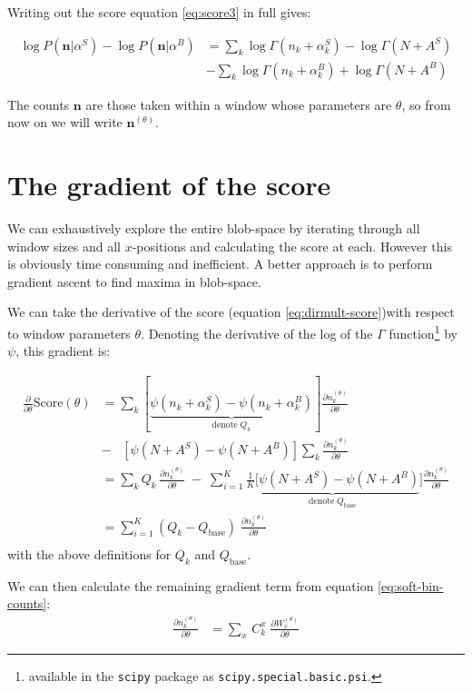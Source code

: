 \documentclass{report}
\begin{document}
Writing out the score equation \ref{eq:score3} in full gives:

\begin{align*}
\log {P(\textbf{n} | \alpha^S)} - \log {P(\textbf{n} | \alpha^B)} &= \sum_k \log \Gamma (n_k + \alpha^S_k) - \log \Gamma (N + A^S) \\
&- \sum_k \log \Gamma (n_k + \alpha^B_k) + \log \Gamma (N + A^B) \label{eq:dirmult-score}
\end{align*}

The counts $\textbf{n}$ are those taken within a window whose parameters are $\theta$, so from now on we will write  $\textbf{n}^{(\theta)}$.


\section{The gradient of the score}

We can exhaustively explore the entire blob-space by iterating through all window sizes and all $x$-positions and calculating the score at each. However this is obviously time consuming and inefficient. A better approach is to perform gradient ascent to find maxima in blob-space.

We can take the derivative of the score (equation
\ref{eq:dirmult-score})with respect to window parameters $\theta$.
Denoting the derivative of the log of the $\Gamma$
function\footnote{available in the {\tt scipy} package as
  \texttt{scipy.special.basic.psi}.} by $\psi$, this gradient is:

\begin{align}
\frac{\partial}{\partial\theta}\text{Score}(\theta) 
&= \sum_k [\underbrace{\psi(n_k + \alpha^S_k) - \psi(n_k + \alpha^B_k)}_{\text{denote} \; Q_k}] \frac{\partial n_k^{(\theta)}}{\partial\theta}\\
& - \;\;\; [\psi(N+A^S) - \psi(N+A^B)]\sum_k \frac{\partial n_k^{(\theta)}}{\partial\theta}\\
&= \sum_k  Q_k \, \frac{\partial n_k^{(\theta)}}{\partial\theta}\;-\;
\sum_{i =1}^K
\underbrace{ \frac{1}{K}[\psi(N+A^S) - \psi(N+A^B)}_{\text{denote} \; Q_\text{base}}] \frac{\partial n_k^{(\theta)}}{\partial\theta} \\
&= \sum_{i=1}^K (Q_k - Q_\text{base}) \; \frac{\partial n_k^{(\theta)}}{\partial\theta}\\
\end{align}
with the above definitions for $Q_k$ and $Q_\text{base}$.

We can then calculate the remaining gradient term from equation
\ref{eq:soft-bin-counts}:
\begin{align}
\frac{\partial n_k^{(\theta)}}{\partial\theta} &= \sum_x \, C^x_k \; \frac{\partial W^{(\theta)}_x}{\partial\theta}
\end{align}
\end{document}
